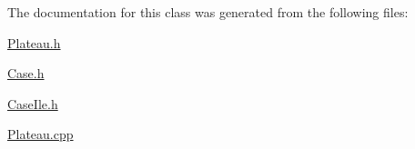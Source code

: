 The documentation for this class was generated from the following files:\begin{DoxyCompactItemize}
\item 
\hyperlink{_plateau_8h}{Plateau.h}\item 
\hyperlink{_case_8h}{Case.h}\item 
\hyperlink{_case_ile_8h}{CaseIle.h}\item 
\hyperlink{_plateau_8cpp}{Plateau.cpp}\end{DoxyCompactItemize}
